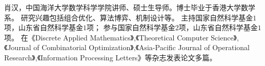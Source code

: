 %
%

\par{
\fontsize{9.65pt}{\baselineskip}\selectfont
肖汉，中国海洋大学数学科学学院讲师、硕士生导师。博士毕业于香港大学数学系。
研究兴趣包括组合优化、算法博弈、机制设计等。
主持国家自然科学基金$1$项，山东省自然科学基金$1$项；
参与国家自然科学基金$2$项，山东省自然科学基金$1$项。
在《Discrete Applied Mathematics》,《Theoretical Computer Science》,《Journal of Combinatorial Optimization》,《Asia-Pacific Journal of Operational Research》,《Information Processing Letters》等杂志发表论文多篇。
}